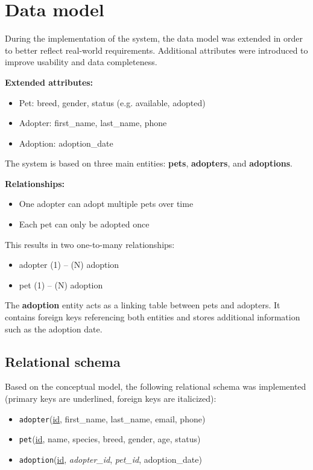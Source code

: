 \documentclass[11pt,a4paper]{article}
\begin{document}
\section{Data model}


During the implementation of the system, the data model was extended in order to
better reflect real-world requirements. Additional attributes were introduced to
improve usability and data completeness.

\textbf{Extended attributes:}
\begin{itemize}
\item Pet: breed, gender, status (e.g. available, adopted)
\item Adopter: first\_name, last\_name, phone
\item Adoption: adoption\_date
\end{itemize}

The system is based on three main entities: \textbf{pets}, \textbf{adopters}, and
\textbf{adoptions}.

\textbf{Relationships:}
\begin{itemize}
\item One adopter can adopt multiple pets over time
\item Each pet can only be adopted once
\end{itemize}

This results in two one-to-many relationships:
\begin{itemize}
\item adopter (1) -- (N) adoption
\item pet (1) -- (N) adoption
\end{itemize}

The \textbf{adoption} entity acts as a linking table between pets and adopters.
It contains foreign keys referencing both entities and stores additional information
such as the adoption date.

\subsection{Relational schema}

Based on the conceptual model, the following relational schema was implemented
(primary keys are underlined, foreign keys are italicized):

\begin{itemize}
\item \texttt{adopter}(\underline{id}, first\_name, last\_name, email, phone)
\item \texttt{pet}(\underline{id}, name, species, breed, gender, age, status)
\item \texttt{adoption}(\underline{id}, \emph{adopter\_id}, \emph{pet\_id}, adoption\_date)
\end{itemize}
\end{document}
